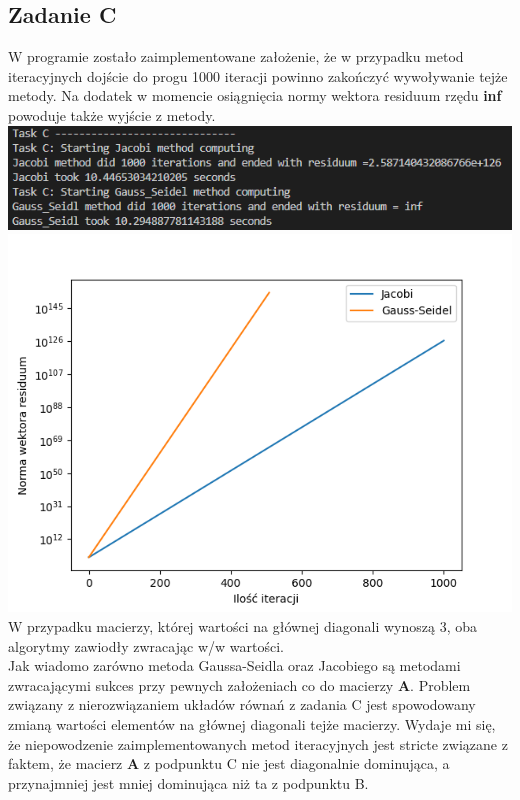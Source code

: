 \documentclass[12pt]{article}
\begin{document}
\subsection{Zadanie C}
W programie zostało zaimplementowane założenie, że w przypadku metod iteracyjnych dojście do progu 1000 iteracji powinno zakończyć wywoływanie tejże metody. Na dodatek w momencie osiągnięcia normy wektora residuum rzędu \textbf{inf} powoduje także wyjście z metody.\\
\includegraphics{zadanieC_1}\\
\includegraphics[scale=0.8]{zadanieC_2}\\
W przypadku macierzy, której wartości na głównej diagonali wynoszą 3, oba algorytmy zawiodły zwracając w/w wartości.\\
Jak wiadomo zarówno metoda Gaussa-Seidla oraz Jacobiego są metodami zwracającymi sukces przy pewnych założeniach co do macierzy \textbf{A}.
Problem związany z nierozwiązaniem układów równań z zadania C jest spowodowany zmianą wartości elementów na głównej diagonali tejże macierzy. Wydaje mi się, 
że niepowodzenie zaimplementowanych metod iteracyjnych jest stricte związane z faktem, że macierz \textbf{A} z podpunktu C nie jest diagonalnie dominująca, 
a przynajmniej jest mniej dominująca niż ta z podpunktu B.
\end{document}
